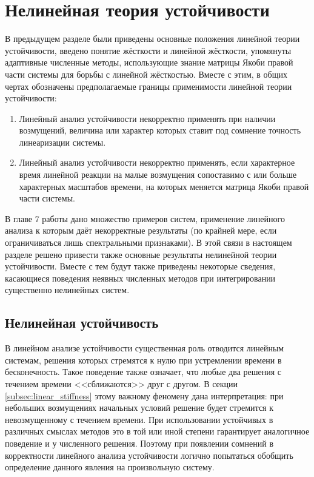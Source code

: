 \newpage
\section{Нелинейная теория устойчивости}
\label{sec:nonlinear_stability}

В предыдущем разделе были приведены основные положения линейной теории устойчивости,
введено понятие жёсткости и линейной жёсткости,
упомянуты адаптивные численные методы, использующие знание матрицы Якоби правой части системы для борьбы с линейной жёсткостью.
Вместе с этим, в общих чертах обозначены предполагаемые границы применимости линейной теории устойчивости:
\begin{enumerate}
    \item
        Линейный анализ устойчивости некорректно применять при наличии возмущений,
        величина или характер которых ставит под сомнение точность линеаризации системы.
    \item
        Линейный анализ устойчивости некорректно применять,
        если характерное время линейной реакции на малые возмущения сопоставимо с или больше характерных масштабов времени,
        на которых меняется матрица Якоби правой части системы.
\end{enumerate}

В главе 7 работы \cite{lambert1991methods} дано множество примеров систем,
применение линейного анализа к которым даёт некорректные результаты
(по крайней мере, если ограничиваться лишь спектральными признаками).
В этой связи в настоящем разделе решено привести также основные результаты нелинейной теории устойчивости.
Вместе с тем будут также приведены некоторые сведения,
касающиеся поведения неявных численных методов при интегрировании существенно нелинейных систем.


\subsection{Нелинейная устойчивость}
\label{subsec:nonlinear_stability}

В линейном анализе устойчивости существенная роль отводится линейным системам,
решения которых стремятся к нулю при устремлении времени в бесконечность.
Такое поведение также означает, что любые два решения с течением времени <<сближаются>> друг с другом.
В секции \ref{subsec:linear_stiffness} этому важному феномену дана интерпретация:
при небольших возмущениях начальных условий решение будет стремится к невозмущенному с течением времени.
При использовании устойчивых в различных смыслах методов это в той или иной степени гарантирует аналогичное поведение и у численного решения.
Поэтому при появлении сомнений в корректности линейного анализа устойчивости логично попытаться обобщить определение данного явления на произвольную систему.

